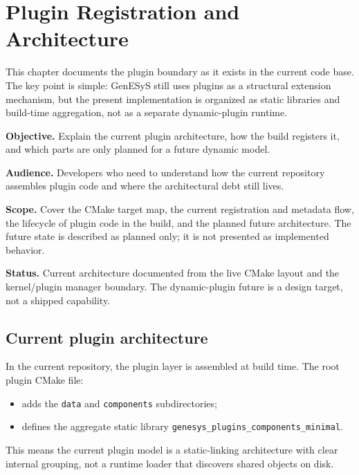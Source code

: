 \chapter{Plugin Registration and Architecture}
\label{chap:plugin-registration-and-architecture}

This chapter documents the plugin boundary as it exists in the current code
base. The key point is simple: GenESyS still uses plugins as a structural
extension mechanism, but the present implementation is organized as static
libraries and build-time aggregation, not as a separate dynamic-plugin
runtime.

\noindent\textbf{Objective.} Explain the current plugin architecture, how the
build registers it, and which parts are only planned for a future dynamic
model.

\noindent\textbf{Audience.} Developers who need to understand how the current
repository assembles plugin code and where the architectural debt still lives.

\noindent\textbf{Scope.} Cover the CMake target map, the current registration
and metadata flow, the lifecycle of plugin code in the build, and the planned
future architecture. The future state is described as planned only; it is not
presented as implemented behavior.

\noindent\textbf{Status.} Current architecture documented from the live CMake
layout and the kernel/plugin manager boundary. The dynamic-plugin future is a
design target, not a shipped capability.

\section{Current plugin architecture}
\label{sec:plugin-current-architecture}

In the current repository, the plugin layer is assembled at build time. The
root plugin CMake file:
\begin{itemize}
 \item adds the \texttt{data} and \texttt{components} subdirectories;
 \item defines the aggregate static library
   \texttt{genesys\_plugins\_components\_minimal}.
\end{itemize}

This means the current plugin model is a static-linking architecture with
clear internal grouping, not a runtime loader that discovers shared objects
on disk.

